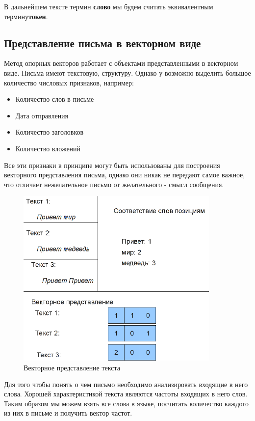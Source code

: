 В дальнейшем тексте термин \textbf{слово} мы будем считать эквивалентным термину\textbf{токен}.

\subsection{Представление письма в векторном виде}
Метод опорных векторов работает с объектами представленными в векторном виде.
Письма имеют текстовую, структуру. Однако у возможно выделить большое количество
числовых признаков, например:
\begin{itemize}
    \item Количество слов в письме
    \item Дата отправления
    \item Количество заголовков
    \item Количество вложений
\end{itemize}
Все эти признаки в принципе могут быть использованы для построения векторного
представления письма, однако они никак не передают самое важное, что отличает
нежелательное письмо от желательного - смысл сообщения.

\begin{figure}[h]
\begin{center}
\includegraphics[width=10cm]{img/vectorize}
\end{center}
\caption{Векторное представление текста}
\label{svm-kernel}
\end{figure}

Для того чтобы понять о чем письмо необходимо анализировать входящие в него слова.
Хорошей характеристикой текста являются частоты входящих в него слов.
Таким образом мы можем взять все слова в языке, посчитать количество каждого из них в письме
и получить вектор частот.

